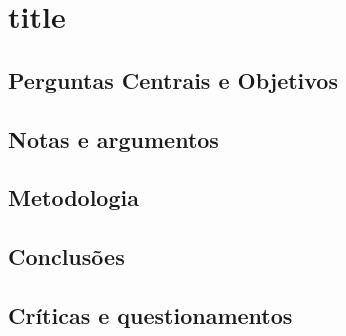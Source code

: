 \documentclass[./../main.tex]{subfiles}
\begin{document}
\pagecolor{page}
\color{text}
\setcounter{secnumdepth}{1}

\frenchspacing
\onehalfspacing

\setlength{\parindent}{1em} %
\setlength{\parskip}{1em} %

\section{title}

\subsection{Perguntas Centrais e Objetivos}

\subsection{Notas e argumentos}

\subsection{Metodologia}

\subsection{Conclusões}

\subsection{Críticas e questionamentos}

\printbibliography
\end{document}
